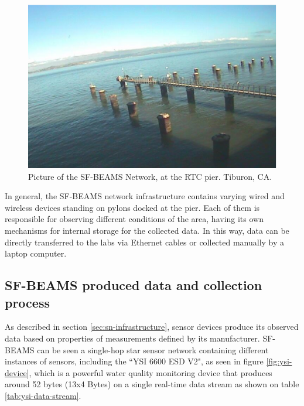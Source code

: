 \begin{figure}[!b]
  \centering
    \includegraphics[scale=0.7]{../diagrams/cam_image-oct15}
  \caption{Picture of the SF-BEAMS Network, at the RTC pier. Tiburon, CA.}
  \label{fig:sf-beams}
\end{figure}

In general, the SF-BEAMS network infrastructure contains varying wired and
wireless devices standing on pylons docked at the pier. Each of them is
responsible for observing different conditions of the area, having its own
mechanisms for internal storage for the collected data. In this way, data can
be directly transferred to the labs via Ethernet cables or collected manually
by a laptop computer.

\subsection{SF-BEAMS produced data and collection process}
\label{sec:sfbeams}

As described in section \ref{sec:sn-infrastructure}, sensor devices produce
its observed data based on properties of measurements defined by its
manufacturer. SF-BEAMS can be seen a single-hop star sensor network containing
different instances of sensors, including the ``YSI 6600 ESD V2", as seen in
figure \ref{fig:ysi-device}, which is a powerful water quality monitoring
device that produces around 52 bytes (13x4 Bytes) on a single real-time data
stream as shown on table \ref{tab:ysi-data-stream}.

